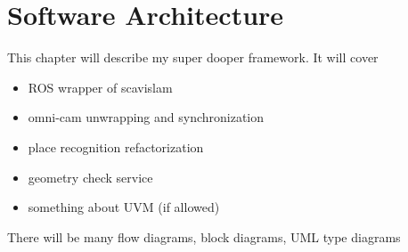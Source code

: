 \chapter{Software Architecture}
\label{chapter:architecture}

This chapter will describe my super dooper framework.  It will cover

\begin{itemize}
 \item ROS wrapper of scavislam
 \item omni-cam unwrapping and synchronization
 \item place recognition refactorization
 \item geometry check service
 \item something about UVM (if allowed)
\end{itemize}

There will be many flow diagrams, block diagrams, UML type diagrams 


